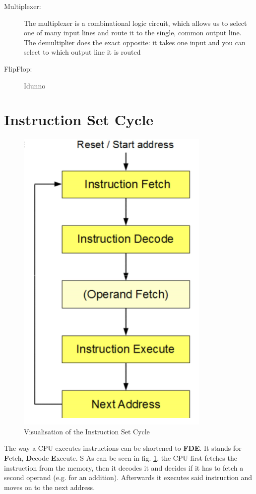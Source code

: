\documentclass[a4paper, 11pt, nofootinbib]{book}
\begin{document}
\begin{description}
	\item[Multiplexer: ] The multiplexer is a combinational logic circuit, which allows us to select one of many input lines and route it to the single, common output line. The demultiplier does the exact opposite: it takes one input and you can select to which output line it is routed
	\item[FlipFlop: ] Idunno %
\end{description}

\section{Instruction Set Cycle}

\begin{figure}
	\centering
	\includegraphics[keepaspectratio=true,height=20\baselineskip]{instructionCycle.PNG}
	\caption{Visualisation of the Instruction Set Cycle}
	\label{fig:instCycle}
\end{figure}

The way a CPU executes instructions can be shortened to \textbf{FDE}. It stands for \textbf{F}etch, \textbf{D}ecode \textbf{E}xecute. 
\vspace{10px}
S
\noindent As can be seen in fig. \ref{fig:instCycle}, the CPU first fetches the instruction from the memory, then it decodes it and decides if it has to fetch a second operand (e.g. for an addition). Afterwards it executes said instruction and moves on to the next address.
\end{document}
